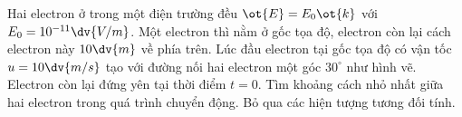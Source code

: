 \newpage
    \begin{vd}
    Hai electron ở trong một điện trường đều $\ot{E}=E_0\ot{k}$ với $E_0=10^{-11}\dv{V/m}$. Một electron thì nằm ở gốc tọa độ, electron còn lại cách electron này $10\dv{m}$ về phía trên. Lúc đầu electron tại gốc tọa độ có vận tốc $u=10\dv{m/s}$ tạo với đường nối hai electron một góc $30^\circ$ như hình vẽ. Electron còn lại đứng yên tại thời điểm $t=0$. Tìm khoảng cách nhỏ nhất giữa hai electron trong quá trình chuyển động. Bỏ qua các hiện tượng tương đối tính. 
       \begin{center}

\begin{tikzpicture}[x=0.75pt,y=0.75pt,yscale=-1,xscale=1]


\end{tikzpicture}
\end{center}
\end{vd}
